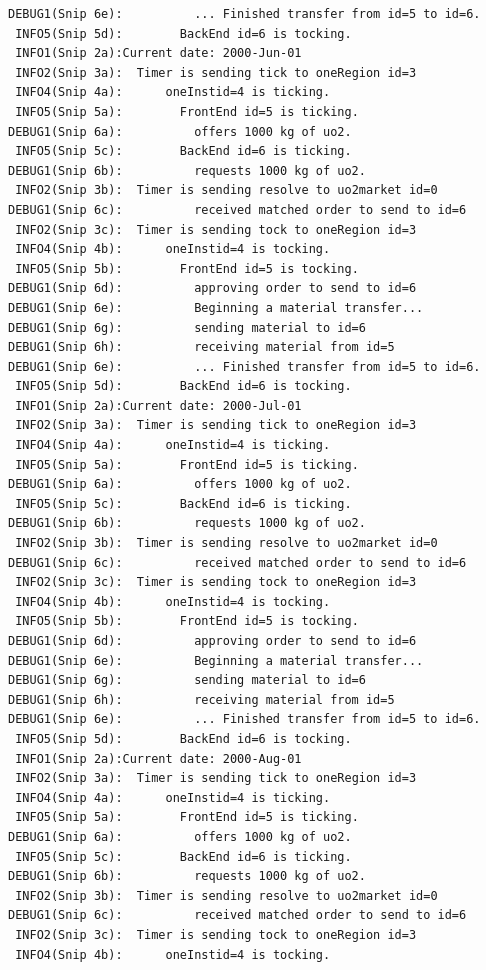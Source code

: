 \documentclass[letterpaper,10pt,english]{sphinxmanual}
\begin{document}
\begin{Verbatim}[commandchars=\\\{\}]
DEBUG1(Snip 6e):          ... Finished transfer from id=5 to id=6.
 INFO5(Snip 5d):        BackEnd id=6 is tocking.
 INFO1(Snip 2a):Current date: 2000-Jun-01
 INFO2(Snip 3a):  Timer is sending tick to oneRegion id=3
 INFO4(Snip 4a):      oneInstid=4 is ticking.
 INFO5(Snip 5a):        FrontEnd id=5 is ticking.
DEBUG1(Snip 6a):          offers 1000 kg of uo2.
 INFO5(Snip 5c):        BackEnd id=6 is ticking.
DEBUG1(Snip 6b):          requests 1000 kg of uo2.
 INFO2(Snip 3b):  Timer is sending resolve to uo2market id=0
DEBUG1(Snip 6c):          received matched order to send to id=6
 INFO2(Snip 3c):  Timer is sending tock to oneRegion id=3
 INFO4(Snip 4b):      oneInstid=4 is tocking.
 INFO5(Snip 5b):        FrontEnd id=5 is tocking.
DEBUG1(Snip 6d):          approving order to send to id=6
DEBUG1(Snip 6e):          Beginning a material transfer...
DEBUG1(Snip 6g):          sending material to id=6
DEBUG1(Snip 6h):          receiving material from id=5
DEBUG1(Snip 6e):          ... Finished transfer from id=5 to id=6.
 INFO5(Snip 5d):        BackEnd id=6 is tocking.
 INFO1(Snip 2a):Current date: 2000-Jul-01
 INFO2(Snip 3a):  Timer is sending tick to oneRegion id=3
 INFO4(Snip 4a):      oneInstid=4 is ticking.
 INFO5(Snip 5a):        FrontEnd id=5 is ticking.
DEBUG1(Snip 6a):          offers 1000 kg of uo2.
 INFO5(Snip 5c):        BackEnd id=6 is ticking.
DEBUG1(Snip 6b):          requests 1000 kg of uo2.
 INFO2(Snip 3b):  Timer is sending resolve to uo2market id=0
DEBUG1(Snip 6c):          received matched order to send to id=6
 INFO2(Snip 3c):  Timer is sending tock to oneRegion id=3
 INFO4(Snip 4b):      oneInstid=4 is tocking.
 INFO5(Snip 5b):        FrontEnd id=5 is tocking.
DEBUG1(Snip 6d):          approving order to send to id=6
DEBUG1(Snip 6e):          Beginning a material transfer...
DEBUG1(Snip 6g):          sending material to id=6
DEBUG1(Snip 6h):          receiving material from id=5
DEBUG1(Snip 6e):          ... Finished transfer from id=5 to id=6.
 INFO5(Snip 5d):        BackEnd id=6 is tocking.
 INFO1(Snip 2a):Current date: 2000-Aug-01
 INFO2(Snip 3a):  Timer is sending tick to oneRegion id=3
 INFO4(Snip 4a):      oneInstid=4 is ticking.
 INFO5(Snip 5a):        FrontEnd id=5 is ticking.
DEBUG1(Snip 6a):          offers 1000 kg of uo2.
 INFO5(Snip 5c):        BackEnd id=6 is ticking.
DEBUG1(Snip 6b):          requests 1000 kg of uo2.
 INFO2(Snip 3b):  Timer is sending resolve to uo2market id=0
DEBUG1(Snip 6c):          received matched order to send to id=6
 INFO2(Snip 3c):  Timer is sending tock to oneRegion id=3
 INFO4(Snip 4b):      oneInstid=4 is tocking.

\end{Verbatim}
\end{document}
